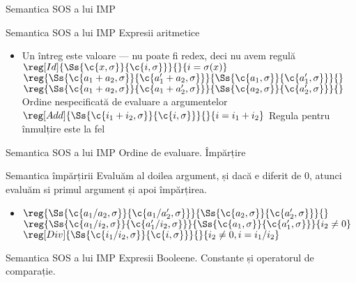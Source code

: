 \documentclass[xcolor=pdftex,romanian,colorlinks]{beamer}
\begin{document}
\begin{section}{Semantica SOS a lui IMP}
\begin{comment}
  $$\sigma[v/x] (y) = \left\{\begin{array}{r@{\mbox{, dacă }}l}
  \sigma	(y) & y \neq x \\
  v & y = x
  \end{array}
  \right.$$
  \end{itemize}
  \end{block}
  \end{frame}
  \end{subsection}
\end{comment}
  \begin{frame}{Semantica SOS a lui IMP}
  {Expresii aritmetice}
  \begin{itemize}
  \item Un întreg este valoare --- nu poate fi redex, deci nu avem regulă
  \vitem[] $\reg[Id]{\Ss{\c{x,\sigma}}{\c{i, \sigma}}}{}{i = \sigma(x)}$
  \vitem[] $\reg{\Ss{\c{a_1 + a_2,\sigma}}{\c{a_1' + a_2,\sigma}}}{\Ss{\c{a_1,\sigma}}{\c{a_1',\sigma}}}{}$\hfill$\reg{\Ss{\c{a_1 + a_2,\sigma}}{\c{a_1 + a_2',\sigma}}}{\Ss{\c{a_2,\sigma}}{\c{a_2',\sigma}}}{}$
  \vitem Ordine nespecificată de evaluare a argumentelor
  \vitem[] $\reg[Add]{\Ss{\c{i_1 + i_2,\sigma}}{\c{i,\sigma}}}{}{i = i_1 + i_2}$
  \vitem Regula pentru înmulțire este la fel
  \end{itemize}
  \end{frame}
  \begin{frame}{Semantica SOS a lui IMP}
  {Ordine de evaluare. Împărțire}
  \begin{block}{Semantica împărțirii}
  Evaluăm al doilea argument, și dacă e diferit de 0, atunci evaluăm si primul argument și apoi împărțirea.
  \end{block}
  \begin{itemize}
  \item[] $\reg{\Ss{\c{a_1 / a_2,\sigma}}{\c{a_1 / a_2',\sigma}}}{\Ss{\c{a_2,\sigma}}{\c{a_2',\sigma}}}{}$
  \vitem[] $\reg{\Ss{\c{a_1 / i_2,\sigma}}{\c{a_1' / i_2,\sigma}}}{\Ss{\c{a_1,\sigma}}{\c{a_1',\sigma}}}{i_2 \neq 0}$
  \vitem[] $\reg[Div]{\Ss{\c{i_1 / i_2,\sigma}}{\c{i,\sigma}}}{}{i_2\neq 0, i = i_1 / i_2}$
  \end{itemize}
  \end{frame}
  \begin{frame}{Semantica SOS a lui IMP}
  {Expresii Booleene. Constante și operatorul de comparație.}
  \begin{itemize}

\end{itemize}
\end{frame}
\end{section}
\end{document}
